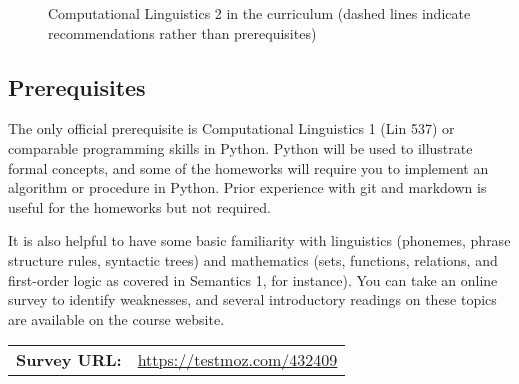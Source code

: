 \begin{figure}
\caption{Computational Linguistics 2 in the curriculum (dashed lines indicate recommendations rather than prerequisites)}
\label{fig:Syllabus_Program}
\end{figure}    

\subsection{Prerequisites}

The only official prerequisite is Computational Linguistics 1 (Lin 537) or comparable programming skills in Python.
Python will be used to illustrate formal concepts, and some of the homeworks will require you to implement an algorithm or procedure in Python.
Prior experience with git and markdown is useful for the homeworks but not required.

It is also helpful to have some basic familiarity with linguistics (phonemes, phrase structure rules, syntactic trees) and mathematics (sets, functions, relations, and first-order logic as covered in Semantics 1, for instance).
You can take an online survey to identify weaknesses, and several introductory readings on these topics are available on the course website.

\medskip
\noindent
\hspace{-.75em}
\begin{tabular}{ll}
    \textbf{Survey URL:} & 
    \href{https://testmoz.com/432409}{https://testmoz.com/432409}
\end{tabular}

